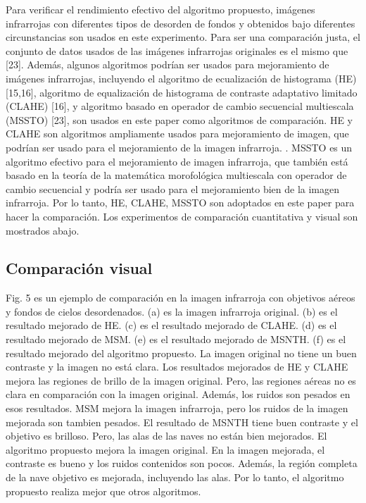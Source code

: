 \documentclass[a4paper, 11 pt, conference]{ieeeconf}      %
\begin{document}
Para verificar el rendimiento efectivo del algoritmo propuesto, im\'agenes infrarrojas con diferentes tipos de desorden de fondos y obtenidos bajo diferentes circunstancias son usados en este experimento. Para ser una comparaci\'on justa, el conjunto de datos usados de las im\'agenes infrarrojas originales es el mismo que [23]. Adem\'as, algunos algoritmos podr\'ian ser usados para mejoramiento de im\'agenes infrarrojas, incluyendo el algoritmo de ecualizaci\'on de histograma (HE)[15,16], algoritmo de equalizaci\'on  de histograma de contraste adaptativo limitado (CLAHE) [16],  y algoritmo basado en operador de cambio secuencial multiescala (MSSTO) [23], son usados en este paper como algoritmos de comparaci\'on. HE y CLAHE son algoritmos ampliamente usados para mejoramiento de imagen, que podr\'ian ser usado para el mejoramiento de la imagen infrarroja. . MSSTO es un algoritmo efectivo para el mejoramiento de imagen infrarroja, que tambi\'en est\'a basado en la teor\'ia de la matem\'atica morofol\'ogica multiescala con operador de cambio secuencial y podr\'ia ser usado para el mejoramiento bien de la imagen infrarroja. Por lo tanto, HE, CLAHE, MSSTO son adoptados en este paper para hacer la comparaci\'on. Los experimentos de comparaci\'on cuantitativa y visual son mostrados abajo.

\subsection{Comparaci\'on visual}

Fig. 5 es un ejemplo de comparaci\'on en la imagen infrarroja con objetivos a\'ereos y fondos de cielos desordenados. (a) es la imagen infrarroja original. (b) es el resultado mejorado de HE. (c) es el resultado mejorado de CLAHE. (d) es el resultado mejorado de MSM. (e) es el resultado mejorado de MSNTH. (f) es el resultado mejorado del algoritmo propuesto. La imagen original no tiene un buen contraste y la imagen no est\'a clara. Los resultados mejorados de HE y CLAHE mejora las regiones de brillo de la imagen original. Pero, las regiones a\'ereas no es clara en comparaci\'on con la imagen original. Adem\'as, los ruidos son pesados en esos resultados. MSM mejora la imagen infrarroja, pero los ruidos de la imagen mejorada son tambien pesados. El resultado de MSNTH tiene buen  contraste y el objetivo es brilloso. Pero, las alas de las naves no est\'an bien mejorados. El algoritmo propuesto mejora la imagen original. En la imagen mejorada, el contraste es bueno y los ruidos contenidos son pocos. Adem\'as, la regi\'on completa de la nave objetivo es mejorada, incluyendo las alas. Por lo tanto, el algoritmo propuesto realiza mejor que otros algoritmos.
\end{document}
